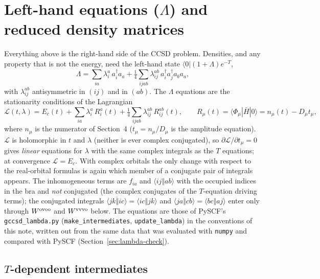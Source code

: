 \documentclass[11pt]{article}
\newcommand{\bra}[1]{\langle #1|}
\newcommand{\ket}[1]{|#1\rangle}
\newcommand{\anti}[4]{\langle #1#2\Vert #3#4\rangle}
\begin{document}
\section{Left-hand equations ($\Lambda$) and reduced density matrices}
\label{sec:lambda}

Everything above is the right-hand side of the CCSD problem. Densities, and any property that is not the energy, need
the left-hand state $\bra{0}(1+\Lambda)e^{-T}$,
\begin{equation}
\Lambda=\sum_{ia}\lambda_i^a\,a_i^\dagger a_a+\tfrac14\sum_{ijab}\lambda_{ij}^{ab}\,a_i^\dagger a_j^\dagger a_b a_a ,
\end{equation}
with $\lambda_{ij}^{ab}$ antisymmetric in $(ij)$ and in $(ab)$. The $\Lambda$ equations are the stationarity conditions of
the Lagrangian
\begin{equation}
\mathcal L(t,\lambda)=E_c(t)+\sum_{ia}\lambda_i^a\,R_i^a(t)+\tfrac14\sum_{ijab}\lambda_{ij}^{ab}\,R_{ij}^{ab}(t),
\qquad R_\mu(t)=\bra{\Phi_\mu}\bar H\ket{0}=n_\mu(t)-D_\mu t_\mu ,
\end{equation}
where $n_\mu$ is the numerator of Section~4 ($t_\mu=n_\mu/D_\mu$ is the amplitude equation). $\mathcal L$ is holomorphic in
$t$ and $\lambda$ (neither is ever complex conjugated), so $\partial\mathcal L/\partial t_\mu=0$ gives \emph{linear}
equations for $\lambda$ with the same complex integrals as the $T$ equations; at convergence $\mathcal L=E_c$. With complex
orbitals the only change with respect to the real-orbital formulas is again which member of a conjugate pair of integrals
appears. The inhomogeneous terms are $f_{ia}$ and $\anti{i}{j}{a}{b}$ with the occupied indices in the bra and
\emph{not} conjugated (the complex conjugates of the $T$-equation driving terms); the conjugated integrals
$\overline{\anti{j}{k}{i}{c}}=\anti{i}{c}{j}{k}$ and $\overline{\anti{j}{a}{c}{b}}=\anti{b}{c}{a}{j}$ enter only through
$W^{\rm ovoo}$ and $W^{\rm vvvo}$ below. The equations are those of PySCF's \texttt{gccsd\_lambda.py}
(\texttt{make\_intermediates}, \texttt{update\_lambda}) in the conventions of this note, written out from the same data that
was evaluated with \texttt{numpy} and compared with PySCF (Section~\ref{sec:lambda-check}).

\subsection{$T$-dependent intermediates}
\end{document}
